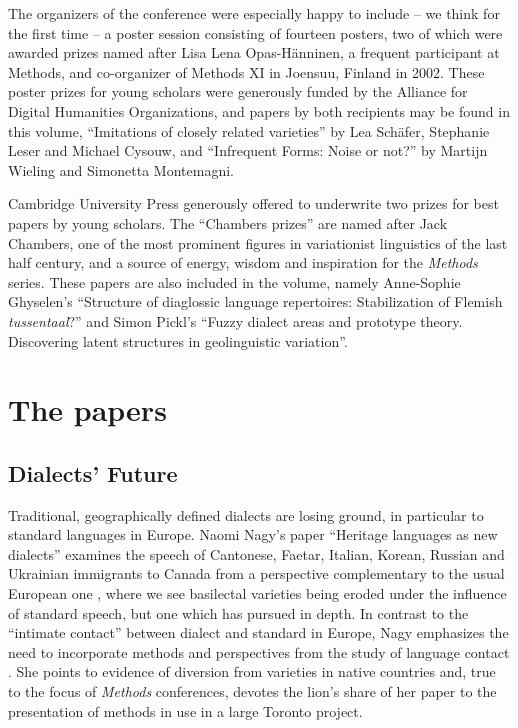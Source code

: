 \documentclass[output=paper]{LSP/langsci}
\begin{document}
The organizers of the conference were especially happy to include – we think for the first time – a poster session consisting of fourteen posters, two of which were awarded prizes named after Lisa Lena Opas-Hänninen, a frequent participant at Methods, and co-organizer of Methods XI in Joensuu, Finland in 2002.  These poster prizes for young scholars were generously funded by the Alliance for Digital Humanities Organizations, and papers by both recipients may be found in this volume, “Imitations of closely related varieties” by Lea Schäfer, Stephanie Leser and Michael Cysouw, and “Infrequent Forms: Noise or not?” by Martijn Wieling and Simonetta Montemagni.

Cambridge University Press generously offered to underwrite two prizes for best papers by young scholars.  The “Chambers prizes” are named after Jack Chambers, one of the most prominent figures in variationist linguistics of the last half century, and a source of energy, wisdom and inspiration for the \textit{Methods} series.  These papers are also included in the volume, namely Anne-Sophie Ghyselen’s “Structure of diaglossic language repertoires: Stabilization of Flemish \textit{tussentaal}?” and Simon Pickl’s “Fuzzy dialect areas and prototype theory.  Discovering latent structures in geolinguistic variation”. 

\section{The papers}
\subsection{Dialects’ Future}

Traditional, geographically defined dialects are losing ground, in particular to standard languages in Europe. Naomi Nagy’s paper “Heritage languages as new dialects” examines the speech of Cantonese, Faetar, Italian, Korean, Russian and Ukrainian immigrants to Canada from a perspective complementary to the usual European one \citep{auer_dialect_2004}, where we see basilectal varieties being eroded under the influence of standard speech, but one which \citet{trudgill_new-dialect_2004} has pursued in depth.  In contrast to the “intimate contact” between dialect and standard in Europe, Nagy emphasizes the need to incorporate methods and perspectives from the study of language contact \citep{hickey_handbook_2010}. She points to evidence of diversion from varieties in native countries and, true to the focus of \textit{Methods} conferences, devotes the lion’s share of her paper to the presentation of methods in use in a large Toronto project.
\end{document}
